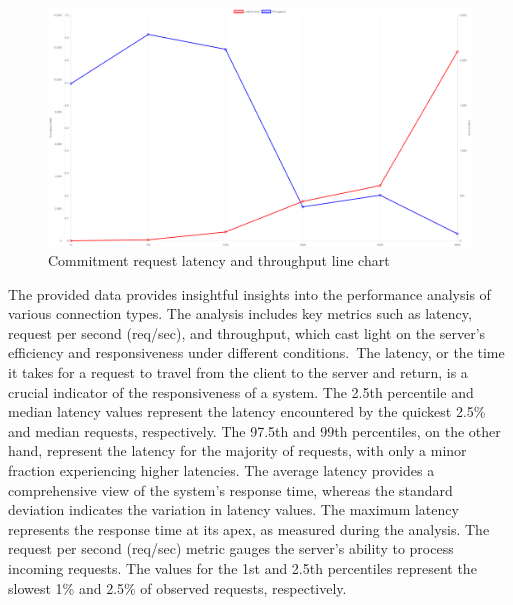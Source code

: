 \documentclass[../Main.tex]{subfiles}
\begin{document}
\begin{figure}[H]
  \centering
  \includegraphics[scale=0.22]{Figure/commitments-line-chart.png}
  \caption{Commitment request latency and throughput line chart}
  \label{fig:commitments-line-chart}
\end{figure}
The provided data provides insightful insights into the performance analysis of various connection types. The analysis includes key metrics such as latency, request per second (req/sec), and throughput, which cast light on the server's efficiency and responsiveness under different conditions. The latency, or the time it takes for a request to travel from the client to the server and return, is a crucial indicator of the responsiveness of a system. The 2.5th percentile and median latency values represent the latency encountered by the quickest 2.5\% and median requests, respectively. The 97.5th and 99th percentiles, on the other hand, represent the latency for the majority of requests, with only a minor fraction experiencing higher latencies. The average latency provides a comprehensive view of the system's response time, whereas the standard deviation indicates the variation in latency values. The maximum latency represents the response time at its apex, as measured during the analysis. The request per second (req/sec) metric gauges the server's ability to process incoming requests. The values for the 1st and 2.5th percentiles represent the slowest 1\% and 2.5\% of observed requests, respectively. \\
\end{document}
